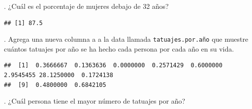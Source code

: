 \documentclass[
]{book}
\newenvironment{Shaded}{\begin{snugshade}}{\end{snugshade}}
\newcommand{\DecValTok}[1]{\textcolor[rgb]{0.00,0.00,0.81}{#1}}
\newcommand{\FunctionTok}[1]{\textcolor[rgb]{0.13,0.29,0.53}{\textbf{#1}}}
\newcommand{\NormalTok}[1]{#1}
\newcommand{\OtherTok}[1]{\textcolor[rgb]{0.56,0.35,0.01}{#1}}
\newcommand{\SpecialCharTok}[1]{\textcolor[rgb]{0.81,0.36,0.00}{\textbf{#1}}}
\newcommand{\StringTok}[1]{\textcolor[rgb]{0.31,0.60,0.02}{#1}}
\begin{document}
\hfill{}.
¿Cuál es el porcentaje de mujeres debajo de 32 años?\\

\begin{Shaded}
\end{Shaded}

\begin{verbatim}
## [1] 87.5
\end{verbatim}

\hfill{}.
Agrega una nueva columna a a la data llamada \texttt{tatuajes.por.año} que muestre cuántos tatuajes por año se ha hecho cada persona por cada año en su vida.\\

\begin{Shaded}
\end{Shaded}

\begin{verbatim}
##  [1]  0.3666667  0.1363636  0.0000000  0.2571429  0.6000000  2.9545455 28.1250000  0.1724138
##  [9]  0.4800000  0.6842105
\end{verbatim}

\hfill{}.
¿Cuál persona tiene el mayor número de tatuajes por año?\\

\begin{Shaded}
\end{Shaded}
\end{document}
